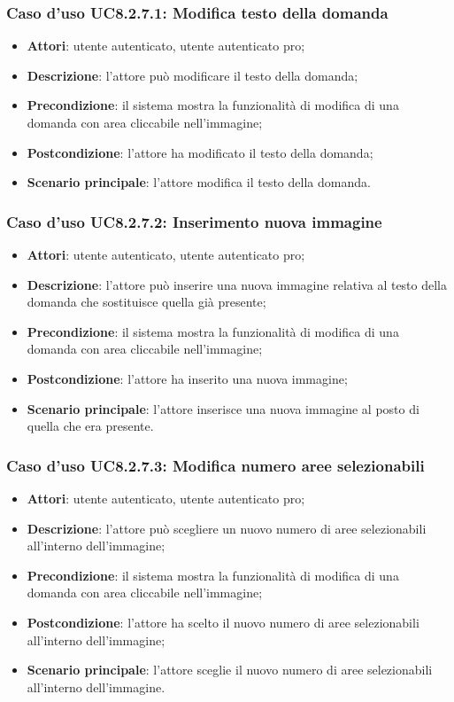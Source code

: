 \subsubsection{Caso d'uso UC8.2.7.1: Modifica testo della domanda}
\begin{itemize}
	\item \textbf{Attori}: utente autenticato, utente autenticato pro;
	\item \textbf{Descrizione}: l'attore può modificare il testo della domanda;
	\item \textbf{Precondizione}: il sistema mostra la funzionalità di modifica di una domanda con area cliccabile nell'immagine; 
	\item \textbf{Postcondizione}: l'attore ha modificato il testo della domanda;
	\item \textbf{Scenario principale}: l'attore modifica il testo della domanda. 
\end{itemize}

\subsubsection{Caso d'uso UC8.2.7.2: Inserimento nuova immagine}
\begin{itemize}
	\item \textbf{Attori}: utente autenticato, utente autenticato pro;
	\item \textbf{Descrizione}: l'attore può inserire una nuova immagine relativa al testo della domanda che sostituisce quella già presente;
	\item \textbf{Precondizione}: il sistema mostra la funzionalità di modifica di una domanda con area cliccabile nell'immagine; 
	
	\item \textbf{Postcondizione}: l'attore ha inserito una nuova immagine;
	\item \textbf{Scenario principale}: l'attore inserisce una nuova immagine al posto di quella che era presente. 	
\end{itemize}

\subsubsection{Caso d'uso UC8.2.7.3: Modifica numero aree selezionabili}
\begin{itemize}
	\item \textbf{Attori}: utente autenticato, utente autenticato pro;
	\item \textbf{Descrizione}: l'attore può scegliere un nuovo numero di aree selezionabili all'interno dell'immagine;
	\item \textbf{Precondizione}: il sistema mostra la funzionalità di modifica di una domanda con area cliccabile nell'immagine; 
	
	\item \textbf{Postcondizione}: l'attore ha scelto il nuovo numero di aree selezionabili all'interno dell'immagine;
	\item \textbf{Scenario principale}: l'attore sceglie il nuovo numero di aree selezionabili all'interno dell'immagine. 	
\end{itemize}

